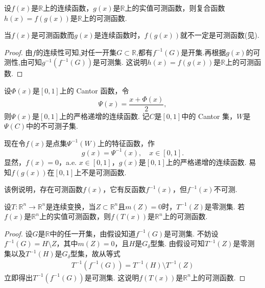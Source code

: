 \documentclass[../../main.tex]{subfiles}
\begin{document}
\begin{theorem}\label{theorem:连续函数复合可测函数也可测}
设\(f(x)\)是\(\mathbb{R}\)上的连续函数，\(g(x)\)是\(\mathbb{R}\)上的实值可测函数，则复合函数\(h(x) = f(g(x))\)是\(\mathbb{R}\)上的可测函数.
\end{theorem}
\begin{remark}
当\(f(x)\)是可测函数而\(g(x)\)是连续函数时，\(f(g(x))\)就不一定是可测函数(见).
\end{remark}
\begin{proof}
由$f$的连续性可知,对任一开集\(G \subset \mathbb{R}\),都有\(f^{-1}(G)\)是开集.再根据\(g(x)\)的可测性,由可知\(g^{-1}(f^{-1}(G))\)是可测集. 这说明\(h(x) = f(g(x))\)是\(\mathbb{R}\)上的可测函数. 

\end{proof}

\begin{example}\label{example:复合函数的可测性反例1}
设\(\varPhi(x)\)是\([0, 1]\)上的 Cantor 函数，令
\[
\varPsi(x)=\frac{x+\varPhi(x)}{2},
\]
则\(\varPsi(x)\)是\([0, 1]\)上的严格递增的连续函数. 记\(C\)是\([0, 1]\)中的 Cantor 集，\(W\)是\(\varPsi(C)\)中的不可测子集.

现在令\(f(x)\)是点集\(\varPsi^{-1}(W)\)上的特征函数，作
\[
g(x)=\varPsi^{-1}(x),\quad x\in[0, 1].
\]
显然，\(f(x) = 0\)，a.e. \(x \in [0, 1]\)，\(g(x)\)是\([0, 1]\)上的严格递增的连续函数. 易知\(f(g(x))\)在\([0, 1]\)上不是可测函数.
\end{example}
\begin{remark}
该例说明，存在可测函数\(f(x)\)，它有反函数\(f^{-1}(x)\)，但\(f^{-1}(x)\)不可测. 
\end{remark}

\begin{theorem}
设\(T: \mathbb{R}^{n} \to \mathbb{R}^{n}\)是连续变换，当\(Z \subset \mathbb{R}^{n}\)且\(m(Z) = 0\)时，\(T^{-1}(Z)\)是零测集. 若\(f(x)\)是\(\mathbb{R}^{n}\)上的实值可测函数，则\(f(T(x))\)是\(\mathbb{R}^{n}\)上的可测函数.
\end{theorem}
\begin{proof}
设\(G\)是\(\mathbb{R}\)中的任一开集，由假设知道\(f^{-1}(G)\)是可测集. 不妨设\(f^{-1}(G) = H \setminus Z\)，其中\(m(Z) = 0\)，且\(H\)是\(G_{\delta}\)型集. 由假设可知\(T^{-1}(Z)\)是零测集以及\(T^{-1}(H)\)是\(G_{\delta}\)型集，故从等式
\begin{align*}
T^{-1}(f^{-1}(G)) = T^{-1}(H) \setminus T^{-1}(Z)
\end{align*}
立即得出\(T^{-1}(f^{-1}(G))\)是可测集. 这说明\(f(T(x))\)是\(\mathbb{R}^{n}\)上的可测函数.

\end{proof}
\end{document}
